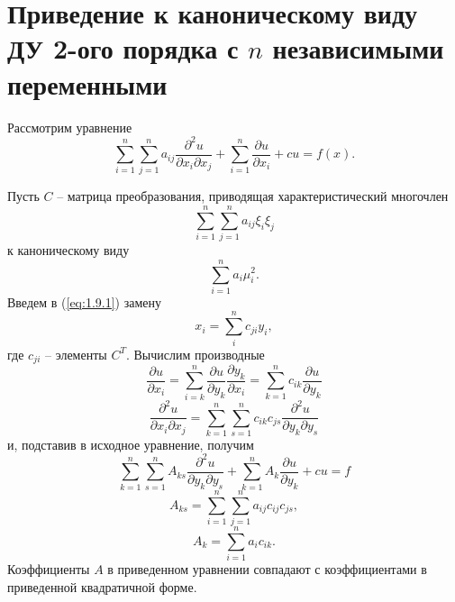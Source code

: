 \documentclass[../main.tex]{subfiles}
\begin{document}
\section{Приведение к каноническому виду ДУ 2-ого порядка с $n$ независимыми переменными}
Рассмотрим уравнение
\begin{equation}  \label{eq:1.9.1}
    \sum_{i=1}^n\sum_{j=1}^n a_{ij} \frac{\partial^2 u}{\partial x_i \partial x_j} + \sum_{i=1}^n \frac{\partial u}{\partial x_i} + cu = f(x).
\end{equation}

Пусть $C$ -- матрица преобразования, приводящая характеристический многочлен $$\sum_{i=1}^n\sum_{j=1}^n a_{ij} \xi_i \xi_j $$ к каноническому виду 
$$\sum_{i=1}^n a_i \mu_i^2.$$
Введем в (\ref{eq:1.9.1}) замену 
$$x_i = \sum_i^n c_{ji}y_i,$$
где $c_{ji}$ -- элементы $C^T$.
Вычислим производные 
$$\frac{\partial u}{\partial x_i} = \sum^n_{i=k}\frac{\partial u}{\partial y_k} \frac{\partial y_k}{\partial x_i} = \sum_{k=1}^n c_{ik} \frac{\partial u}{\partial y_k}$$
$$\frac{\partial^2 u}{\partial x_i \partial x_j} = \sum^n_{k=1}\sum^n_{s=1} c_{ik} c_{js} \frac{\partial^2 u}{\partial y_k \partial y_s}$$
и, подставив в исходное уравнение, получим
\begin{equation}
\boxed{\sum^n_{k=1}\sum^n_{s=1} A_{ks} \frac{\partial^2 u}{\partial y_k \partial y_s} + \sum_{k=1}^n A_k \frac{\partial u}{\partial y_k} + cu = f}
\end{equation}
$$A_{ks} = \sum^n_{i=1}\sum^n_{j=1} a_{ij} c_{ij} c_{js},$$
$$A_k = \sum_{i=1}^n a_i c_{ik}.$$
Коэффициенты $A$ в приведенном уравнении совпадают с коэффициентами в приведенной квадратичной форме.
\end{document}
